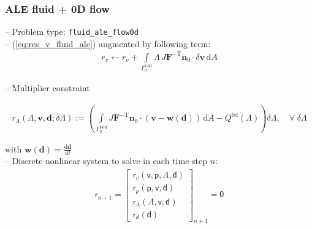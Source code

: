 \documentclass[a4paper,12pt]{report}
\newcommand{\fF}{\text{f}}
\newcommand{\bs}[1]{\boldsymbol{#1}}
\newcommand{\Gm}{\mathit{\Gamma}}
\newcommand{\ROP}{\bs{\mathsf{r}}}
\newcommand{\LMZ}{\bs{\mathsf{\Lambda}}}
\begin{document}
\subsubsection{ALE fluid + 0D flow}\label{subsubsec:fluid_ale_flow0d}
-- Problem type: \verb"fluid_ale_flow0d"\\

-- (\ref{eq:res_v_fluid_ale}) augmented by following term:
\begin{align}
r_v \leftarrow r_v + \int\limits_{\Gm_0^{\fF\text{-}\mathrm{0d}}}\!\mathit{\Lambda}\,J\bs{F}^{-\mathrm{T}}\bs{n}_{0}\cdot\delta\bs{v}\,\mathrm{d}A
\end{align}

-- Multiplier constraint

\begin{align}
r_{\mathit{\Lambda}}(\mathit{\Lambda},\bs{v},\bs{d};\delta\mathit{\Lambda}):= \left(\int\limits_{\Gm_0^{\mathrm{\fF\text{-}0d}}}\! J\bs{F}^{-\mathrm{T}}\bs{n}_{0}\cdot(\bs{v}-\bs{w}(\bs{d}))\,\mathrm{d}A - Q^{\mathrm{0d}}(\mathit{\Lambda})\right) \delta\mathit{\Lambda}, \quad \forall \; \delta\mathit{\Lambda}
\end{align}

with $\bs{w}(\bs{d})=\frac{\mathrm{d}\bs{d}}{\mathrm{d}t}$\\

-- Discrete nonlinear system to solve in each time step $n$:
\begin{align}
\ROP_{n+1} = \begin{bmatrix} \ROP_{v}(\bs{\mathsf{v}},\bs{\mathsf{p}},\LMZ,\bs{\mathsf{d}}) \\ \ROP_{p}(\bs{\mathsf{p}},\bs{\mathsf{v}},\bs{\mathsf{d}}) \\ \ROP_{\mathit{\Lambda}}(\LMZ,\bs{\mathsf{v}},\bs{\mathsf{d}}) \\ \ROP_{d}(\bs{\mathsf{d}}) \end{bmatrix}_{n+1} = \bs{\mathsf{0}}\label{eq:nonlin_sys_fluid_ale_0d}
\end{align}
\end{document}
